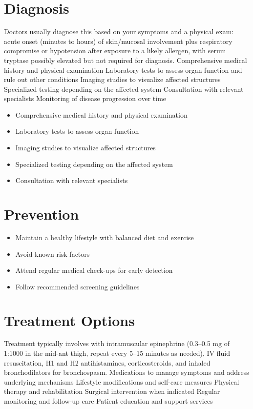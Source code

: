 \section{Diagnosis}
Doctors usually diagnose this based on your symptoms and a physical exam: acute onset (minutes to hours) of skin/mucosal involvement plus respiratory compromise or hypotension after exposure to a likely allergen, with serum tryptase possibly elevated but not required for diagnosis. Comprehensive medical history and physical examination Laboratory tests to assess organ function and rule out other conditions Imaging studies to visualize affected structures Specialized testing depending on the affected system Consultation with relevant specialists Monitoring of disease progression over time

\begin{itemize}[noitemsep]
  \item Comprehensive medical history and physical examination
  \item Laboratory tests to assess organ function
  \item Imaging studies to visualize affected structures
  \item Specialized testing depending on the affected system
  \item Consultation with relevant specialists
\end{itemize}
\section{Prevention}
\begin{itemize}[noitemsep]
  \item Maintain a healthy lifestyle with balanced diet and exercise
  \item Avoid known risk factors
  \item Attend regular medical check-ups for early detection
  \item Follow recommended screening guidelines
\end{itemize}
\section{Treatment Options}
Treatment typically involves with intramuscular epinephrine (0.3--0.5 mg of 1:1000 in the mid-ant thigh, repeat every 5--15 minutes as needed), IV fluid resuscitation, H1 and H2 antihistamines, corticosteroids, and inhaled bronchodilators for bronchospasm. Medications to manage symptoms and address underlying mechanisms Lifestyle modifications and self-care measures Physical therapy and rehabilitation Surgical intervention when indicated Regular monitoring and follow-up care Patient education and support services


